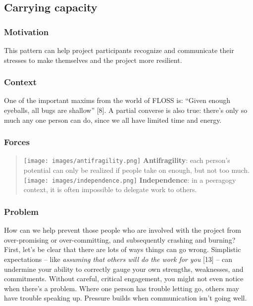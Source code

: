 \hypertarget{carrying-capacity}{%
\subsection{Carrying capacity}\label{carrying-capacity}}

\hypertarget{motivation}{%
\subsubsection{Motivation}\label{motivation}}

This pattern can help project participants recognize and communicate
their stresses to make themselves and the project more resilient.

\hypertarget{context}{%
\subsubsection{Context}\label{context}}

One of the important maxims from the world of FLOSS is: ``Given enough
eyeballs, all bugs are shallow'' {{[}8{]}}. A partial converse is also
true: there's only so much any one person can do, since we all have
limited time and energy.

\hypertarget{forces}{%
\subsubsection{Forces}\label{forces}}

\begin{quote}
\texttt{[image: images/antifragility.png]} \textbf{Antifragility}: each
person's potential can only be realized if people take on enough, but
not too much.\\
\texttt{[image: images/independence.png]} \textbf{Independence}: in a
peeragogy context, it is often impossible to delegate work to others.
\end{quote}

\hypertarget{problem}{%
\subsubsection{Problem}\label{problem}}

How can we help prevent those people who are involved with the project
from over-promising or over-committing, and subsequently crashing and
burning? First, let's be clear that there are lots of ways things can go
wrong. Simplistic expectations -- like \emph{assuming that others will
do the work for you} {{[}13{]}} -- can undermine your ability to
correctly gauge your own strengths, weaknesses, and commitments. Without
careful, critical engagement, you might not even notice when there's a
problem. Where one person has trouble letting go, others may have
trouble speaking up. Pressure builds when communication isn't going
well.

